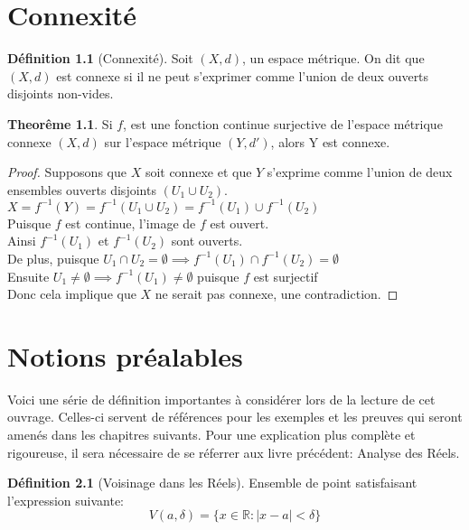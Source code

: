 \documentclass[12pt]{book}
\let\Bbb\mathbb
\theoremstyle{definition}
\newtheorem{definition}{Définition}[section]
\newtheorem{theorem}{Theorême}[section]
\begin{document}
\chapter{Connexité}
\begin{definition}[Connexité]
    \label{def:connexite}
    Soit $(X,d)$, un espace métrique. On dit que $(X,d)$ est connexe si il ne peut s'exprimer comme l'union de deux ouverts disjoints non-vides.
\end{definition}

\begin{theorem}
    Si $f$, est une fonction continue surjective de l'espace métrique connexe $(X,d)$ sur l'espace métrique $(Y, d')$, alors Y est connexe.
\end{theorem}

\begin{proof}
    Supposons que $X$ soit connexe et que $Y$ s'exprime comme l'union de deux ensembles ouverts disjoints $(U_1 \cup U_2)$.\\
    $X = f^{-1}(Y) = f^{-1}(U_1 \cup U_2) = f^{-1}(U_1) \cup f^{-1}(U_2)$\\
    Puisque $f$ est continue, l'image de $f$ est ouvert. \\
    Ainsi $f^{-1}(U_1)$ et $f^{-1}(U_2)$ sont ouverts.\\
    De plus, puisque $U_1 \cap U_2 = \emptyset \implies f^{-1}(U_1) \cap f^{-1}(U_2) = \emptyset$\\
    Ensuite $U_1 \neq \emptyset \implies f^{-1}(U_1) \neq \emptyset$ puisque $f$ est surjectif\\
    Donc cela implique que $X$ ne serait pas connexe, une contradiction.
\end{proof}

\appendix
\chapter{Notions préalables}
Voici une série de définition importantes à considérer lors de la lecture de cet ouvrage. Celles-ci servent
de références pour les exemples et les preuves qui seront amenés dans les chapitres suivants. Pour une explication
plus complète et rigoureuse, il sera nécessaire de se réferrer aux livre précédent: Analyse des Réels.

\begin{definition}[Voisinage dans les Réels]
    \label{def:voisinage_reels}
    Ensemble de point satisfaisant l'expression
    suivante: $$V(a, \delta) = \{ x \in \Bbb R : |x - a| < \delta \}$$
\end{definition}
\end{document}
